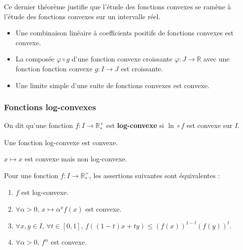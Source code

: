 	Ce dernier théorème justifie que l'étude des fonctions convexes se ramène à l'étude des fonctions convexes sur un intervalle réel.
	
	\begin{proposition}
		\begin{itemize}
			\item Une combinaison linéaire à coefficients positifs de fonctions convexes est convexe.
			\item La composée $\varphi \circ g$ d'une fonction convexe croissante $\varphi : J \rightarrow \mathbb{R}$ avec une fonction fonction convexe $g : I \rightarrow J$ est croissante.
			\item Une limite simple d'une suite de fonctions convexes est convexe.
		\end{itemize}
	\end{proposition}
	
	\subsubsection{Fonctions log-convexes}
	
	
	\begin{definition}
		On dit qu'une fonction $f : I \rightarrow \mathbb{R}^+_*$ est \textbf{log-convexe} si $\ln \circ f$ est convexe sur $I$.
	\end{definition}
	
	\begin{proposition}
		Une fonction log-convexe est convexe.
	\end{proposition}
	
	\begin{cexample}
		$x \mapsto x$ est convexe mais non log-convexe.
	\end{cexample}
	
	\begin{theorem}
		Pour une fonction $f : I \rightarrow \mathbb{R}^+_*$, les assertions suivantes sont équivalentes :
		\begin{enumerate}[label=(\roman*)]
			\item $f$ est log-convexe.
			\item $\forall \alpha > 0, \, x \mapsto \alpha^x f(x)$ est convexe.
			\item $\forall x, y \in I, \, \forall t \in [0,1], \, f((1-t)x + ty) \leq (f(x))^{1-t} (f(y))^t$.
			\item $\forall \alpha > 0, \, f^\alpha$ est convexe.
		\end{enumerate}
	\end{theorem}
	
